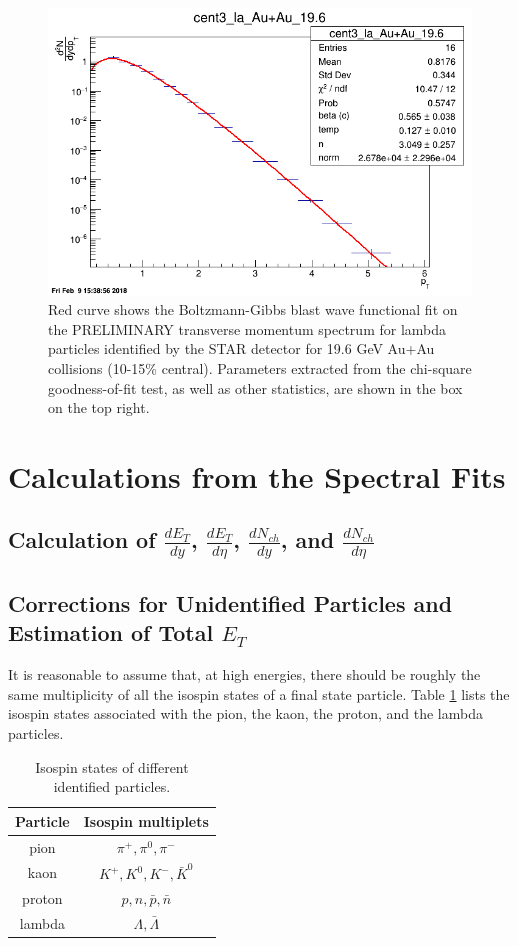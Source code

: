 	\begin{figure}[h]
	  \centering
	  \includegraphics[width=4.5in]{figures/cent3_la_Au+Au_196.png}
	  \caption{Red curve shows the Boltzmann-Gibbs blast wave functional fit on the PRELIMINARY transverse momentum spectrum for lambda particles identified by the STAR detector for 19.6 GeV Au+Au collisions (10-15\% central). Parameters extracted from the chi-square goodness-of-fit test, as well as other statistics, are shown in the box on the top right.}\label{fig:fit}
	\end{figure}

\section{Calculations from the Spectral Fits}
\subsection{Calculation of $\frac{dE_{T}}{dy}$, $\frac{dE_{T}}{d\eta}$, $\frac{dN_{ch}}{dy}$, and $\frac{dN_{ch}}{d\eta}$}
\subsection{Corrections for Unidentified Particles and Estimation of Total $E_{T}$}\label{corrections}
It is reasonable to assume that, at high energies, there should be roughly the same multiplicity of all the isospin states of a final state particle. Table \ref{table:isospinStates} lists the isospin states associated with the pion, the kaon, the proton, and the lambda particles.

	\begin{table}[h!]
	\centering
	\begin{tabular}{|c c|}
	\hline
	Particle & Isospin multiplets \\ [0.5ex]
	\hline
	\hline
	pion & $\pi^{+}, \pi^{0}, \pi^{-} $ \\
	kaon & $K^{+}, K^{0}, K^{-}, \bar{K}^{0}$ \\
	proton & $p, n, \bar{p}, \bar{n}$  \\
	lambda & $\Lambda, \bar{\Lambda}$  \\ [1ex]
	\hline
	\end{tabular}
	\caption{Isospin states of different identified particles.}
	\label{table:isospinStates}
	\end{table}
	
